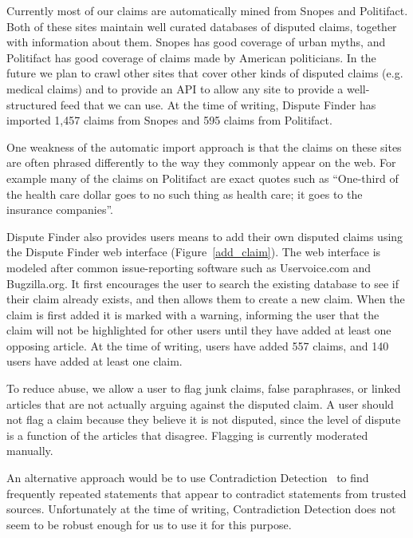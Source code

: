 \documentclass{www2010-accepted}
\begin{document}
Currently most of our claims are automatically mined from Snopes and Politifact. Both of these sites maintain well curated databases of disputed claims, together with information about them. Snopes has good coverage of urban myths, and Politifact has good coverage of claims made by American politicians. In the future we plan to crawl other sites that cover other kinds of disputed claims (e.g. medical claims) and to provide an API to allow any site to provide a well-structured feed that we can use. At the time of writing, Dispute Finder has imported 1,457 claims from Snopes and 595 claims from Politifact.

One weakness of the automatic import approach is that the claims on these sites are often phrased differently to the way they commonly appear on the web. For example many of the claims on Politifact are exact quotes such as ``One-third of the health care dollar goes to no such thing as health care; it goes to the insurance companies''. 

Dispute Finder also provides users means to add their own disputed claims using the Dispute Finder web interface (Figure~\ref{add_claim}). The web interface is modeled after common issue-reporting software such as Uservoice.com and Bugzilla.org. It first encourages the user to search the existing database to see if their claim already exists, and then allows them to create a new claim. When the claim is first added it is marked with a warning, informing the user that the claim will not be highlighted for other users until they have added at least one opposing article. 
At the time of writing, users have added 557 claims, and 140 users have added at least one claim.

To reduce abuse, we allow a user to flag junk claims, false paraphrases, or linked articles that are not actually arguing against the disputed claim. A user should not flag a claim because they believe it is not disputed, since the level of dispute is a function of the articles that disagree. Flagging is currently moderated manually.


An alternative approach would be to use Contradiction Detection~\cite{Ritter} to find frequently repeated statements that appear to contradict statements from trusted sources. Unfortunately at the time of writing, Contradiction Detection does not seem to be robust enough for us to use it for this purpose.
\end{document}
